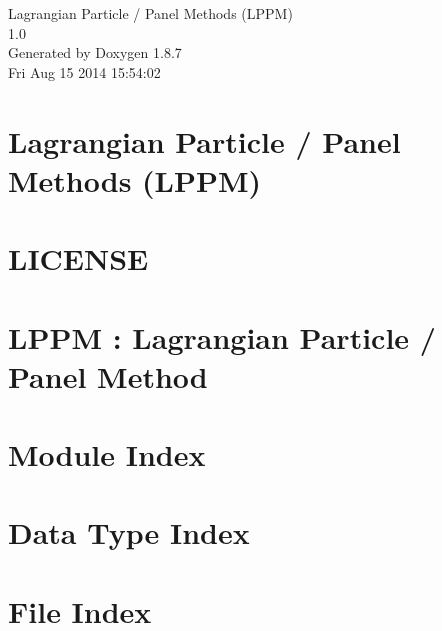 \documentclass[twoside]{book}
\newcommand{\+}{\discretionary{\mbox{\scriptsize$\hookleftarrow$}}{}{}}
\newcommand{\clearemptydoublepage}{%
  \newpage{\pagestyle{empty}\cleardoublepage}%
}
\begin{document}
\hypersetup{pageanchor=false,
             bookmarks=true,
             bookmarksnumbered=true,
             pdfencoding=unicode
            }
\begin{titlepage}
\vspace*{7cm}
\begin{center}%
{\Large Lagrangian Particle / Panel Methods (L\+P\+P\+M) \\[1ex]\large 1.\+0 }\\
\vspace*{1cm}
{\large Generated by Doxygen 1.8.7}\\
\vspace*{0.5cm}
{\small Fri Aug 15 2014 15:54:02}\\
\end{center}
\end{titlepage}
\clearemptydoublepage
\tableofcontents
\clearemptydoublepage
{}
\hypersetup{pageanchor=true}

\chapter{Lagrangian Particle / Panel Methods (L\+P\+P\+M)}
\label{index}\hypertarget{index}{}
\chapter{L\+I\+C\+E\+N\+S\+E}
\label{md_LICENSE}
\hypertarget{md_LICENSE}{}

\chapter{L\+P\+P\+M \+: Lagrangian Particle / Panel Method}
\label{md_README}
\hypertarget{md_README}{}

\chapter{Module Index}

\chapter{Data Type Index}

\chapter{File Index}

\end{document}
